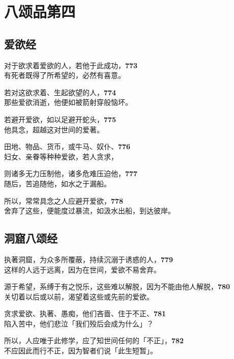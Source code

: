 \chapter{八颂品第四}

\section{爱欲经}


对于欲求着爱欲的人，若他于此成功，\hfill{\grayfootnotesize \textbf{773}} \\
有死者既得了所希望的，必然有喜意。


若对这欲求着、生起欲望的人，\hfill{\grayfootnotesize \textbf{774}} \\
那些爱欲消逝，他便如被箭射穿般恼坏。


若避开爱欲，如以足避开蛇头，\hfill{\grayfootnotesize \textbf{775}} \\
他具念，超越这对世间的爱著。


田地、物品、货币，或牛马、奴仆、\hfill{\grayfootnotesize \textbf{776}} \\
妇女、亲眷等种种爱欲，若人贪求，


则诸多无力压制他，诸多危难压迫他，\hfill{\grayfootnotesize \textbf{777}} \\
随后，苦追随他，如水之于漏船。


所以，常常具念之人应避开爱欲，\hfill{\grayfootnotesize \textbf{778}} \\
舍弃了这些，便能度过暴流，如汲水出船，到达彼岸。


\section{洞窟八颂经}


执著洞窟，为众多所覆蔽，持续沉溺于诱惑的人，\hfill{\grayfootnotesize \textbf{779}} \\
这样的人远于远离，因为在世间，爱欲不易舍弃。


源于希望，系缚于有之悦乐，这些难以解脱，因为不能由他人解脱，\hfill{\grayfootnotesize \textbf{780}} \\
关切着以后或以前，渴望着这些或先前的爱欲。


贪求爱欲、执著、愚痴，他们吝啬、住于不正、\hfill{\grayfootnotesize \textbf{781}} \\
陷入苦中，他们悲泣「我们殁后会成为什么」？


所以，人应唯于此修学，应了知世间任何的「不正」，\hfill{\grayfootnotesize \textbf{782}} \\
不应因此而行不正，因为智者们说「此生短暂」。


